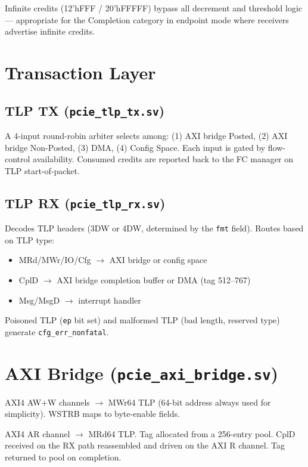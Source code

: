 \documentclass[12pt,a4paper]{report}
\begin{document}
Infinite credits (12'h\textsc{FFF} / 20'h\textsc{FFFFF}) bypass all
decrement and threshold logic — appropriate for the Completion category in
endpoint mode where receivers advertise infinite credits.

\section{Transaction Layer}

\subsection{TLP TX (\texttt{pcie\_tlp\_tx.sv})}

A 4-input round-robin arbiter selects among:
(1) AXI bridge Posted, (2) AXI bridge Non-Posted, (3) DMA, (4) Config Space.
Each input is gated by flow-control availability. Consumed credits are
reported back to the FC manager on TLP start-of-packet.

\subsection{TLP RX (\texttt{pcie\_tlp\_rx.sv})}

Decodes TLP headers (3DW or 4DW, determined by the \texttt{fmt} field).
Routes based on TLP type:
\begin{itemize}[noitemsep]
  \item MRd/MWr/IO/Cfg $\to$ AXI bridge or config space
  \item CplD $\to$ AXI bridge completion buffer or DMA (tag 512--767)
  \item Msg/MsgD $\to$ interrupt handler
\end{itemize}
Poisoned TLP (\texttt{ep} bit set) and malformed TLP (bad length, reserved type)
generate \texttt{cfg\_err\_nonfatal}.

\section{AXI Bridge (\texttt{pcie\_axi\_bridge.sv})}

\begin{description}[leftmargin=3cm,style=nextline]
  \item[Write path] AXI4 AW+W channels $\to$ MWr64 TLP (64-bit address always
    used for simplicity). WSTRB maps to byte-enable fields.
  \item[Read path] AXI4 AR channel $\to$ MRd64 TLP. Tag allocated from a
    256-entry pool. CplD received on the RX path reassembled and driven on
    the AXI R channel. Tag returned to pool on completion.
\end{description}
\end{document}
